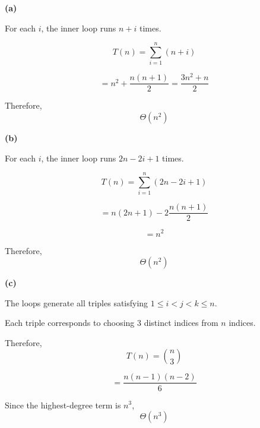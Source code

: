 \documentclass[10pt,letterpaper,unboxed,cm]{article}
\begin{document}
\begin{enumerate}
\begin{enumerate}
\end{enumerate}

\textbf{(a)}

For each $i$, the inner loop runs $n+i$ times.

\[T(n)=\sum_{i=1}^{n}(n+i)\]

\[=n^2+\frac{n(n+1)}{2}=\boxed{\frac{3n^2+n}{2}}\]

Therefore,
\[\boxed{\Theta(n^2)}\]

\textbf{(b)}

For each $i$, the inner loop runs
$2n-2i+1$ times.

\[T(n)=\sum_{i=1}^{n}(2n-2i+1)\]

\[=n(2n+1)-2\frac{n(n+1)}{2}\]

\[=\boxed{n^2}\]

Therefore,
\[\boxed{\Theta(n^2)}\]

\textbf{(c)}

The loops generate all triples satisfying
$1\leq i<j<k\leq n$.

Each triple corresponds to choosing 3
distinct indices from $n$ indices.

Therefore,
\[T(n)=\binom{n}{3}\]

\[=\boxed{\frac{n(n-1)(n-2)}{6}}\]

Since the highest-degree term is $n^3$,
\[\boxed{\Theta(n^3)}\]


\end{enumerate}
\end{document}
